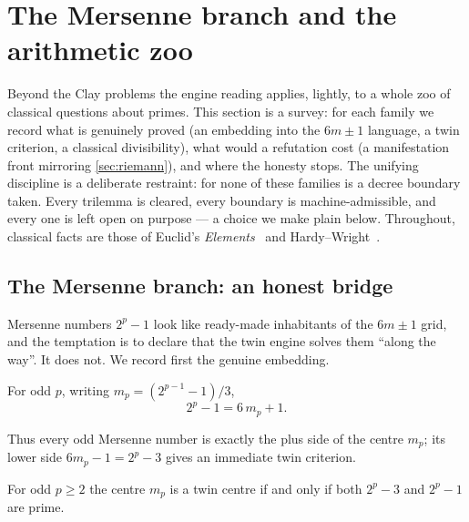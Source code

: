 \section{The Mersenne branch and the arithmetic zoo}\label{sec:zoo}

Beyond the Clay problems the engine reading applies, lightly, to a whole zoo of classical
questions about primes. This section is a survey: for each family we record what is
genuinely proved (an embedding into the $6m\pm1$ language, a twin criterion, a classical
divisibility), what would a refutation cost (a manifestation front mirroring
\cref{sec:riemann}), and where the honesty stops. The unifying discipline is a deliberate
restraint: for none of these families is a decree boundary taken. Every trilemma is
cleared, every boundary is machine-admissible, and every one is left open on purpose ---
a choice we make plain below. Throughout, classical facts are those of Euclid's
\emph{Elements}~\cite{euclid-elements} and Hardy--Wright~\cite{hardy-wright}.

\subsection{The Mersenne branch: an honest bridge}

Mersenne numbers $2^p-1$ look like ready-made inhabitants of the $6m\pm1$ grid, and the
temptation is to declare that the twin engine solves them ``along the way''. It does not.
We record first the genuine embedding.

\begin{theorem}\label{thm:mersenne_eq_sixCenter_add_one}
\green{}\; For odd $p$, writing $m_p=(2^{p-1}-1)/3$,
\begin{equation}\label{eq:mersenne-embed}
  2^p-1 = 6\,m_p+1.
\end{equation}
\end{theorem}

Thus every odd Mersenne number is exactly the plus side of the centre $m_p$; its lower side
$6m_p-1 = 2^p-3$ gives an immediate twin criterion.

\begin{theorem}\label{thm:isTwinCenter_mersenneCenter_iff}
\green{}\; For odd $p\ge 2$ the centre $m_p$ is a twin centre if and only if both $2^p-3$
and $2^p-1$ are prime. 
\end{theorem}

